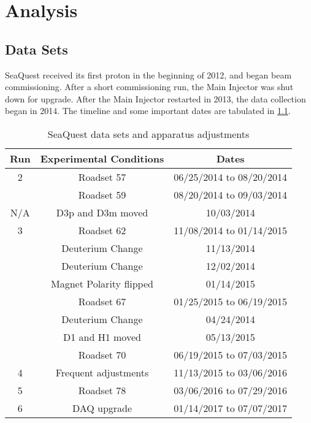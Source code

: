 \documentclass[../main.tex]{subfiles}
\begin{document}
\ifSubfilesClassLoaded{
	\mainmatter
	\setcounter{chapter}{4}
}{}

\chapter{Analysis}
\label{ch:analysis}

\section{Data Sets}
SeaQuest received its first proton in the beginning of 2012, and began beam
commissioning. After a short commissioning run, the Main Injector was shut down for
upgrade. After the Main Injector restarted in 2013, the data collection began in
2014. The timeline and some important dates are tabulated in \cref{tab:dataset}.
\begin{table}[h!]
	\centering
	\begin{tabular}{ c c c }
		\hline
		Run & Experimental Conditions & Dates                    \\
		\hline
		2   & Roadset 57              & 06/25/2014 to 08/20/2014 \\
		    & Roadset 59              & 08/20/2014 to 09/03/2014 \\
		\hline
		N/A & D3p and D3m moved       & 10/03/2014               \\
		\hline
		3   & Roadset 62              & 11/08/2014 to 01/14/2015 \\
		    & Deuterium Change        & 11/13/2014               \\
		    & Deuterium Change        & 12/02/2014               \\
		    & Magnet Polarity flipped & 01/14/2015               \\
		    & Roadset 67              & 01/25/2015 to 06/19/2015 \\
		    & Deuterium Change        & 04/24/2014               \\
		    & D1 and H1 moved         & 05/13/2015               \\
		    & Roadset 70              & 06/19/2015 to 07/03/2015 \\
		\hline
		4   & Frequent adjustments    & 11/13/2015 to 03/06/2016 \\
		5   & Roadset 78              & 03/06/2016 to 07/29/2016 \\
		6   & DAQ upgrade             & 01/14/2017 to 07/07/2017 \\ \hline
	\end{tabular}
	\caption{SeaQuest data sets and apparatus adjustments}
	\label{tab:dataset}
\end{table}
\end{document}
